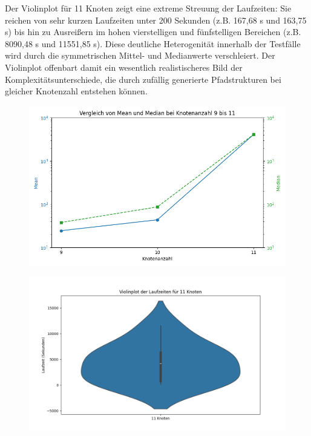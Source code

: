 \documentclass[bachelor, german]{algothesis}
\begin{document}
Der Violinplot für 11 Knoten zeigt eine extreme Streuung der Laufzeiten: Sie reichen von sehr kurzen Laufzeiten unter 200 Sekunden (z.B. 167,68 s und 163,75 s) bis hin zu Ausreißern im hohen vierstelligen und fünfstelligen Bereichen (z.B. 8090,48 s und 11551,85 s). Diese deutliche Heterogenität innerhalb der Testfälle wird durch die symmetrischen Mittel- und Medianwerte verschleiert. Der Violinplot offenbart damit ein wesentlich realistischeres Bild der Komplexitätsunterschiede, die durch zufällig generierte Pfadstrukturen bei gleicher Knotenzahl entstehen können. \newline 
\begin{figure}[H]
    \centering
    \begin{minipage}{0.48\textwidth}
        \centering
        \includegraphics[width=\textwidth]{figures/Mean_Medain9-11.png}
        \label{fig:Median9}
    \end{minipage}
    \hfill
    \begin{minipage}{0.48\textwidth}
        \centering
        \includegraphics[width=\textwidth]{figures/11NodesViolinplot.png}
        \label{fig:Violin}
    \end{minipage}
\end{figure}
\end{document}
